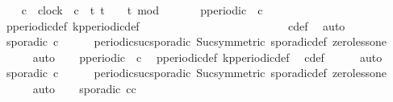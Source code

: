 \begin{isabellebody}
\ \ \isamarkupfalse%
\ c{\isacharprime}\ {\isacharcolon}{\isacharcolon}\ clock\ \ {\isacartoucheopen}c{\isacharprime}\ {\isacharequal}\ {\isacharparenleft}{\isasymlambda}t{\isachardot}\ t\ {\isasymge}\ {}\ {\isasymand}\ {\isacharparenleft}t{\isacharminus}{}{\isacharparenright}\ mod\ {}\ {\isacharequal}\ {}{\isacharparenright}{\isacartoucheclose}\isanewline
\isanewline
\ \ \isamarkupfalse%
\ {\isacartoucheopen}p{\isacharunderscore}periodic\ {}\ c{\isacartoucheclose}\ \isamarkupfalse%
\ p{\isacharunderscore}periodic{\isacharunderscore}def\ kp{\isacharunderscore}periodic{\isacharunderscore}def\isanewline
\ \ \ \ \ \ \ \ \ \ \ \ \ \ \ \ \ \ \ \ \ \ \ \ \isamarkupfalse%
\ c{\isacharunderscore}def\ \isamarkupfalse%
\ auto\isanewline
\ \ \isamarkupfalse%
\ {}{\isacharcolon}{\isacartoucheopen}sporadic\ c{\isacartoucheclose}\isanewline
\ \ \ \ \isamarkupfalse%
\ periodic{\isacharunderscore}suc{\isacharunderscore}sporadic\ Suc{\isacharunderscore}{}{\isacharbrackleft}symmetric{\isacharbrackright}\ sporadic{\isacharunderscore}def\ zero{\isacharunderscore}less{\isacharunderscore}one\isanewline
\ \ \ \ \isamarkupfalse%
\ auto\isanewline
\isanewline
\ \ \isamarkupfalse%
\ {\isacartoucheopen}p{\isacharunderscore}periodic\ {}\ c{\isacharprime}{\isacartoucheclose}\ \isamarkupfalse%
\ p{\isacharunderscore}periodic{\isacharunderscore}def\ kp{\isacharunderscore}periodic{\isacharunderscore}def\ \isamarkupfalse%
\ c{\isacharprime}{\isacharunderscore}def\isanewline
\ \ \ \ \isamarkupfalse%
\ auto\isanewline
\ \ \isamarkupfalse%
\ {}{\isacharcolon}{\isacartoucheopen}sporadic\ c{\isacharprime}{\isacartoucheclose}\isanewline
\ \ \ \ \isamarkupfalse%
\ periodic{\isacharunderscore}suc{\isacharunderscore}sporadic\ Suc{\isacharunderscore}{}{\isacharbrackleft}symmetric{\isacharbrackright}\ sporadic{\isacharunderscore}def\ zero{\isacharunderscore}less{\isacharunderscore}one\isanewline
\ \ \ \ \isamarkupfalse%
\ auto\isanewline
\isanewline
\ \ \isamarkupfalse%
\ {\isacartoucheopen}{\isasymnot}sporadic\ {\isacharparenleft}c{\isasymoplus}c{\isacharprime}{\isacharparenright}{\isacartoucheclose}\isanewline
\ \ \isamarkupfalse%
\ {\isacharminus}\isanewline
\ \ \ \ \isacommand{{\isacharbraceleft}}\isamarkupfalse%

\end{isabellebody}
